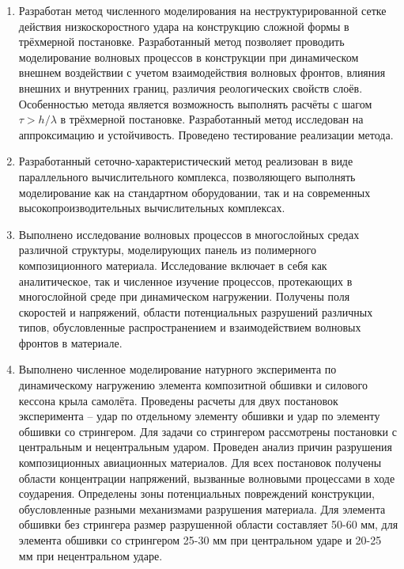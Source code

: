 \begin{enumerate}

\item Разработан метод численного моделирования на неструктурированной сетке действия низкоскоростного удара на конструкцию сложной формы в трёхмерной постановке. Разработанный метод позволяет проводить моделирование волновых процессов в конструкции при динамическом внешнем воздействии с учетом взаимодействия волновых фронтов, влияния внешних и внутренних границ, различия реологических свойств слоёв. Особенностью метода является возможность выполнять расчёты с шагом $\tau > h / \lambda$ в трёхмерной постановке. Разработанный метод исследован на аппроксимацию и устойчивость. Проведено тестирование реализации метода.

\item Разработанный сеточно-характеристический метод реализован в виде параллельного вычислительного комплекса, позволяющего выполнять моделирование как на стандартном оборудовании, так и на современных высокопроизводительных вычислительных комплексах.

\item Выполнено исследование волновых процессов в многослойных средах различной структуры, моделирующих панель из полимерного композиционного материала. Исследование включает в себя как аналитическое, так и численное изучение процессов, протекающих в многослойной среде при динамическом нагружении. Получены поля скоростей и напряжений, области потенциальных разрушений различных типов, обусловленные распространением и взаимодействием волновых фронтов в материале.

\item Выполнено численное моделирование натурного эксперимента по динамическому нагружению элемента композитной обшивки и силового кессона крыла самолёта. Проведены расчеты для двух постановок эксперимента -- удар по отдельному элементу обшивки и удар по элементу обшивки со стрингером. Для задачи со стрингером рассмотрены постановки с центральным и нецентральным ударом. Проведен анализ причин разрушения композиционных авиационных материалов. Для всех постановок получены области концентрации напряжений, вызванные волновыми процессами в ходе соударения. Определены зоны потенциальных повреждений конструкции, обусловленные разными механизмами разрушения материала. Для элемента обшивки без стрингера размер разрушенной области составляет 50-60 мм, для элемента обшивки со стрингером 25-30 мм при центральном ударе и 20-25 мм при нецентральном ударе.


\end{enumerate}
